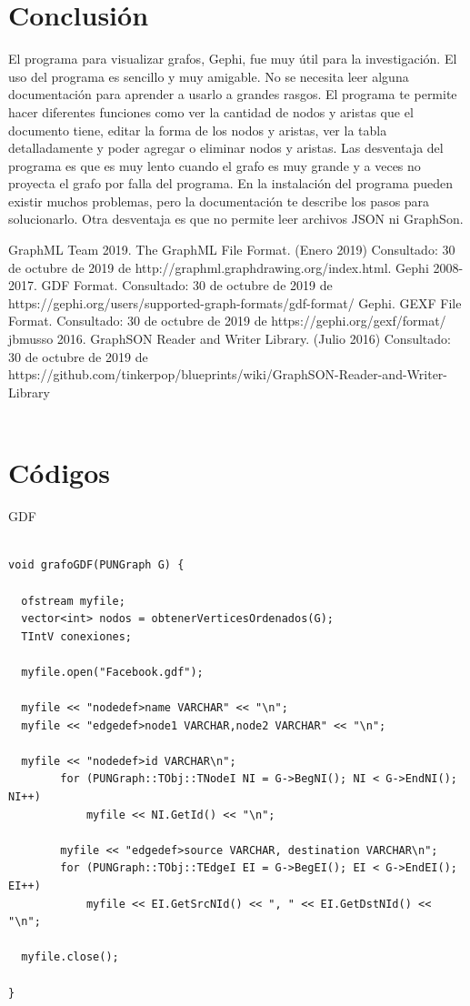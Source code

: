 \documentclass[book, 16 pt, conference]{ieeeconf}
\begin{document}
\section{Conclusión}

El programa para visualizar grafos, Gephi, fue muy útil para la investigación. El uso del programa es sencillo y muy amigable. No se necesita leer alguna documentación para aprender a usarlo a grandes rasgos. El programa te permite hacer diferentes funciones como ver la cantidad de nodos y aristas que el documento tiene, editar la forma de los nodos y aristas, ver la tabla detalladamente y poder agregar o eliminar nodos y aristas. Las desventaja del programa es que es muy lento cuando el grafo es muy grande y a veces no proyecta el grafo por falla del programa. En la instalación del programa pueden existir muchos problemas, pero la documentación te describe los pasos para solucionarlo. Otra desventaja es que no permite leer archivos JSON ni GraphSon.

\begin{thebibliography}{99}

 GraphML Team 2019. The GraphML File Format. (Enero 2019) Consultado: 30 de octubre de 2019 de http://graphml.graphdrawing.org/index.html.
 Gephi 2008-2017. GDF Format. Consultado: 30 de octubre de 2019 de https://gephi.org/users/supported-graph-formats/gdf-format/
 Gephi. GEXF File Format. Consultado: 30 de octubre de 2019 de https://gephi.org/gexf/format/
  jbmusso 2016. GraphSON Reader and Writer Library. (Julio 2016) Consultado: 30 de octubre de 2019 de https://github.com/tinkerpop/blueprints/wiki/GraphSON-Reader-and-Writer-Library\\\\

\end{thebibliography}

\section{Códigos}

GDF

\begin{lstlisting}

void grafoGDF(PUNGraph G) {

  ofstream myfile;
  vector<int> nodos = obtenerVerticesOrdenados(G);
  TIntV conexiones;

  myfile.open("Facebook.gdf");

  myfile << "nodedef>name VARCHAR" << "\n";
  myfile << "edgedef>node1 VARCHAR,node2 VARCHAR" << "\n";

  myfile << "nodedef>id VARCHAR\n";
		for (PUNGraph::TObj::TNodeI NI = G->BegNI(); NI < G->EndNI(); NI++)
			myfile << NI.GetId() << "\n";

		myfile << "edgedef>source VARCHAR, destination VARCHAR\n";
		for (PUNGraph::TObj::TEdgeI EI = G->BegEI(); EI < G->EndEI(); EI++)
			myfile << EI.GetSrcNId() << ", " << EI.GetDstNId() << "\n";

  myfile.close();

}

\end{lstlisting}
\end{document}
